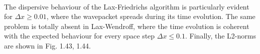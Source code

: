 \documentclass[11pt,a4paper]{article}
\begin{document}
\begin{figure}[!h]
\begin{center}
{\label{fig:first}}
\end{center}
\end{figure}\\
The dispersive behaviour of the Lax-Friedrichs algorithm is particularly evident for $\Delta x \geq 0.01$, where the wavepacket spreads during its time evolution. The same problem is totally absent in Lax-Wendroff, where the time evolution is coherent with the expected behaviour for every space step $\Delta x \leq 0.1$. Finally, the L2-norms are shown in Fig. 1.43, 1.44. 
\end{document}
